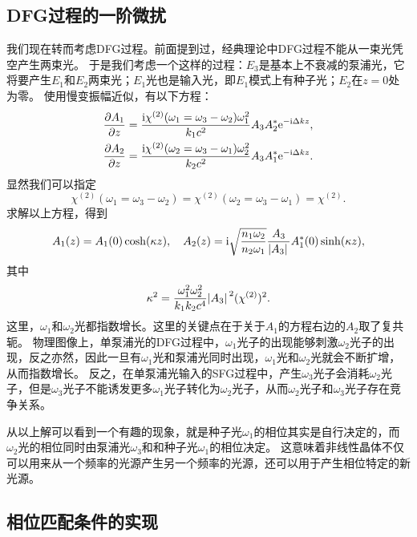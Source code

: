 \subsection{DFG过程的一阶微扰}

我们现在转而考虑DFG过程。前面提到过，经典理论中DFG过程不能从一束光凭空产生两束光。
于是我们考虑一个这样的过程：$E_3$是基本上不衰减的泵浦光，它将要产生$E_1$和$E_2$两束光；$E_1$光也是输入光，即$E_1$模式上有种子光；$E_2$在$z=0$处为零。
使用慢变振幅近似，有以下方程：
\[
    \begin{aligned}
        \pdv{A_1}{z} &= \frac{\mathrm{i} \chi^{(2)}(\omega_1 = \omega_3 - \omega_2) \omega_1^2}{k_1 c^2} A_3 A_2^* \mathrm{e}^{-\mathrm{i} \Delta k z}, \\
        \pdv{A_2}{z} &= \frac{\mathrm{i} \chi^{(2)}(\omega_2 = \omega_3 - \omega_1) \omega_2^2}{k_2 c^2} A_3 A_1^* \mathrm{e}^{-\mathrm{i} \Delta k z}.
    \end{aligned}
\]
显然我们可以指定
\begin{equation}
    \chi^{(2)}(\omega_1 = \omega_3 - \omega_2) = \chi^{(2)}(\omega_2 = \omega_3 - \omega_1) = \chi^{(2)}.
\end{equation}
求解以上方程，得到
\begin{equation}
    A_1(z) = A_1(0) \cosh(\kappa z), \quad A_2(z) = \mathrm{i} \sqrt{\frac{n_1 \omega_2}{n_2 \omega_1}} \frac{A_3}{\abs*{A_3}} A_1^*(0) \sinh(\kappa z),
    \label{eq:dfg-amplitude}
\end{equation}
其中
\begin{equation}
    \kappa^2 = \frac{\omega_1^2 \omega_2^2}{k_1 k_2 c^4} \abs*{A_3}^2 (\chi^{(2)})^2 .
\end{equation}
这里，$\omega_1$和$\omega_2$光都指数增长。这里的关键点在于关于$A_1$的方程右边的$A_2$取了复共轭。
物理图像上，单泵浦光的DFG过程中，$\omega_1$光子的出现能够刺激$\omega_2$光子的出现，反之亦然，因此一旦有$\omega_1$光和泵浦光同时出现，$\omega_1$光和$\omega_2$光就会不断扩增，从而指数增长。
反之，在单泵浦光输入的SFG过程中，产生$\omega_3$光子会消耗$\omega_2$光子，但是$\omega_3$光子不能诱发更多$\omega_1$光子转化为$\omega_2$光子，从而$\omega_2$光子和$\omega_3$光子存在竞争关系。

从以上解可以看到一个有趣的现象，就是种子光$\omega_1$的相位其实是自行决定的，而$\omega_2$光的相位同时由泵浦光$\omega_3$和和种子光$\omega_1$的相位决定。
这意味着非线性晶体不仅可以用来从一个频率的光源产生另一个频率的光源，还可以用于产生相位特定的新光源。

\subsection{相位匹配条件的实现}

